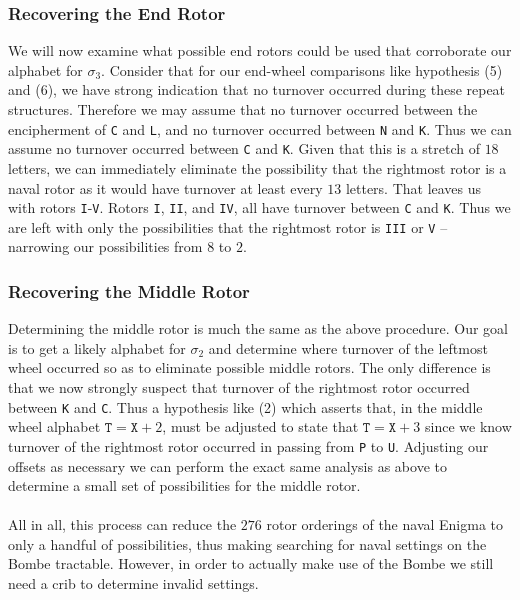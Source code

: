   \subsubsection{Recovering the End Rotor}
  We will now examine what possible end rotors could be used that
  corroborate our alphabet for $\sigma_3$. Consider that for our
  end-wheel comparisons like hypothesis (5) and (6), we have strong
  indication that no turnover occurred during these repeat
  structures. Therefore we may assume that no turnover occurred
  between the encipherment of \texttt{C} and \texttt{L}, and no
  turnover occurred between \texttt{N} and \texttt{K}. Thus we can
  assume no turnover occurred between \texttt{C} and \texttt{K}.
  Given that this is a stretch of $18$ letters, we can immediately
  eliminate the possibility that the rightmost rotor is a naval rotor
  as it would have turnover at least every $13$ letters. That leaves
  us with rotors \texttt{I}-\texttt{V}. Rotors \texttt{I},
  \texttt{II}, and \texttt{IV}, all have turnover between \texttt{C}
  and \texttt{K}. Thus we are left with only the possibilities that
  the rightmost rotor is \texttt{III} or \texttt{V} -- narrowing our
  possibilities from $8$ to $2$.

  \subsubsection{Recovering the Middle Rotor}
  Determining the middle rotor is much the same as the above
  procedure. Our goal is to get a likely alphabet for $\sigma_2$ and
  determine where turnover of the leftmost wheel occurred so as to
  eliminate possible middle rotors. The only difference is that we
  now strongly suspect that turnover of the rightmost rotor occurred
  between \texttt{K} and \texttt{C}. Thus a hypothesis like (2) which
  asserts that, in the middle wheel alphabet $\texttt{T} = \texttt{X}
  + 2$, must be adjusted to state that $\texttt{T} = \texttt{X} + 3$
  since we know turnover of the rightmost rotor occurred in passing
  from \texttt{P} to \texttt{U}. Adjusting our offsets as necessary
  we can perform the exact same analysis as above to determine a
  small set of possibilities for the middle rotor.
  \\\\All in all, this process can reduce the $276$ rotor orderings
  of the naval Enigma to only a handful of possibilities, thus making
  searching for naval settings on the Bombe tractable. However, in
  order to actually make use of the Bombe we still need a crib to
  determine invalid settings.

